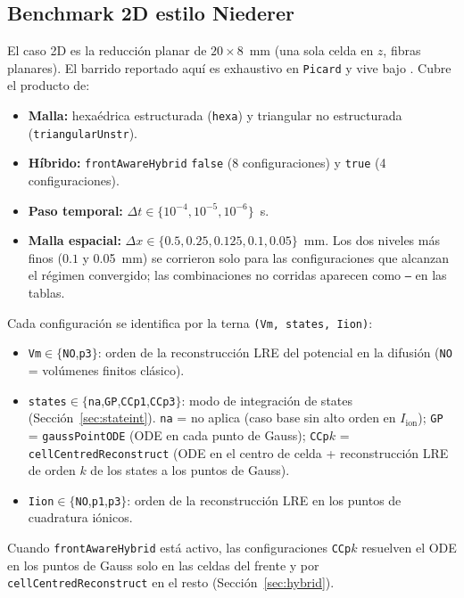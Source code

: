 \documentclass[11pt,a4paper]{article}
\newcommand{\code}[1]{\texttt{\small #1}}
\newcommand{\Iion}{I_{\mathrm{ion}}}
\begin{document}
\subsection{Benchmark 2D estilo Niederer}
\label{sec:results:2D}

El caso 2D es la reducción planar de $20\times 8$~mm (una sola celda en $z$, fibras
planares). El barrido reportado aquí es exhaustivo en \code{Picard} y vive bajo
.
Cubre el producto de:
\begin{itemize}[topsep=2pt,itemsep=1pt]
  \item \textbf{Malla:} hexaédrica estructurada (\code{hexa}) y triangular no
        estructurada (\code{triangularUnstr}).
  \item \textbf{Híbrido:} \code{frontAwareHybrid} \code{false} (8 configuraciones) y
        \code{true} (4 configuraciones).
  \item \textbf{Paso temporal:} $\Delta t\in\{10^{-4},10^{-5},10^{-6}\}$~s.
  \item \textbf{Malla espacial:} $\Delta x\in\{0.5,0.25,0.125,0.1,0.05\}$~mm. Los dos
        niveles más finos ($0.1$ y \SI{0.05}{mm}) se corrieron solo para las
        configuraciones que alcanzan el régimen convergido; las combinaciones no
        corridas aparecen como \texttt{--} en las tablas.
\end{itemize}
Cada configuración se identifica por la terna \code{(Vm, states, Iion)}:
\begin{itemize}[topsep=2pt,itemsep=1pt]
  \item \code{Vm}$\in\{$\code{NO},\code{p3}$\}$: orden de la reconstrucción LRE del
        potencial en la difusión (\code{NO} = volúmenes finitos clásico).
  \item \code{states}$\in\{$\code{na},\code{GP},\code{CCp1},\code{CCp3}$\}$: modo de
        integración de states (Sección~\ref{sec:stateint}). \code{na} = no aplica
        (caso base sin alto orden en $\Iion$); \code{GP} = \code{gaussPointODE} (ODE
        en cada punto de Gauss); \code{CCp$k$} = \code{cellCentredReconstruct} (ODE
        en el centro de celda + reconstrucción LRE de orden $k$ de los states a los
        puntos de Gauss).
  \item \code{Iion}$\in\{$\code{NO},\code{p1},\code{p3}$\}$: orden de la
        reconstrucción LRE en los puntos de cuadratura iónicos.
\end{itemize}
Cuando \code{frontAwareHybrid} está activo, las configuraciones \code{CCp$k$}
resuelven el ODE en los puntos de Gauss solo en las celdas del frente y por
\code{cellCentredReconstruct} en el resto (Sección~\ref{sec:hybrid}).
\end{document}
